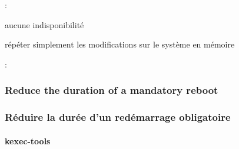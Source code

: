 :
\begin{itmz}
\item{
{aucune indisponibilité}}
\item{
{répéter simplement les modifications sur le système en mémoire}}
\end{itmz}

:
\begin{itmz}
\item{\ml{\todo}
{\todo}}
\end{itmz}

\ml
{\subsubsection{Reduce the duration of a mandatory reboot}}
{\subsubsection{Réduire la durée d’un redémarrage obligatoire}}

\paragraph{kexec-tools}
